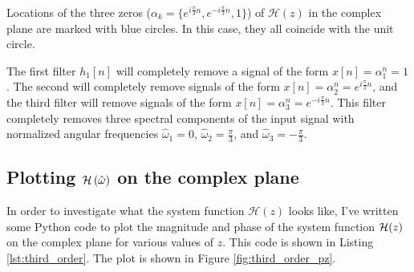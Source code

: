 \begin{marginfigure}[-5cm]
  \begin{center}
  \end{center}
  \caption{Locations of the three zeros
  ($\alpha_k=\{e^{i\frac{\pi}{3}n},e^{-i\frac{\pi}{3}n},1\}$) of
  $\mathcal{H}(z)$ in the complex plane are marked with blue
  circles. In this case, they all coincide with the unit circle.}
  \label{fig:pole_zero_third_order}
\end{marginfigure}

The first filter $h_1[n]$ will completely remove a signal of the form
$x[n]=\alpha_1^n = 1$. The second will completely remove signals of the
form $x[n]=\alpha_2^n = e^{i\frac{\pi}{3}n}$, and the third filter will
remove signals of the form $x[n]=\alpha_3^n = e^{-i\frac{\pi}{3}n}$. This
filter completely removes three spectral components of the input
signal with normalized angular frequencies $\hat{\omega}_1=0$,
$\hat{\omega}_2=\frac{\pi}{3}$, and $\hat{\omega}_3=-\frac{\pi}{3}$.

\subsection{Plotting $\mathcal{H}\left(\hat{\omega}\right)$ on the complex plane}
In order to investigate what the system function $\mathcal{H}(z)$
looks like, I've written some Python code to plot the magnitude and
phase of the system function $\mathcal{H}(z)$ on the complex plane for various
values of $z$. This code is shown in Listing
\ref{lst:third_order}. The plot is shown in Figure
\ref{fig:third_order_pz}.


